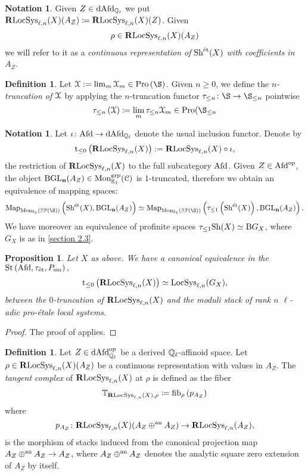 \documentclass[10pt,a4paper]{amsart}
\numberwithin{equation}{subsection}
\theoremstyle{plain}
\newtheorem{prop}[theorem]{Proposition}
\theoremstyle{definition}
\newtheorem{defi}[theorem]{Definition}
\newtheorem{notation}[theorem]{Notation}
\theoremstyle{remark}
\numberwithin{equation}{section}
\begin{document}
\begin{notation}
Given $Z \in \mathrm{dAfd}_{\mathbb{Q}_\ell}$ we put $\mathbf R \mathrm{LocSys}_{\ell, n}(X)(A_Z) \coloneqq \mathbf R \mathrm{LocSys}_{\ell, n}(X)(Z)$. Given 
	\[
		\rho \in \mathbf R \mathrm{LocSys}_{\ell, n}(X)(A_Z)
	\]
we will refer to it as a \emph{continuous representation of }$\mathrm{Sh}^{\text{\'et}}(X)$ \emph{with coefficients in $A_Z$}.
\end{notation}

\begin{defi}
Let $\cX := \lim_m \cX_m \in \pro \left( \S \right)$. Given $n \geq 0$, we define the \emph{$n$-truncation of $\mathcal X$} by applying the $n$-truncation functor $\tau_{\leq n} \colon \S \to \S_{\leq n }$ pointwise
	\[
		\tau_{\leq n} \left(  \cX \right) \coloneqq \lim_m \tau_{\leq n } \cX_m  \in \pro( \S_{\leq n}
	\]
\end{defi}

\begin{notation}
Let $\iota \colon \mathrm{Afd} \to \mathrm{dAfd}_{\mathbb{Q}_\ell}$ denote the usual inclusion functor. Denote by
	\[
		\mathrm t_{\leq 0} \left( \mathbf R \mathrm{LocSys}_{\ell, n}(X) \right) := \mathbf R \mathrm{LocSys}_{\ell, n}(X) \circ \iota,
	\]
the restriction of $\mathbf R \mathrm{LocSys}_{\ell, n}(X)$ to the full subcategory $\mathrm{Afd}$. Given
$Z \in \mathrm{Afd}^{\mathrm{op}}$, the object $\mathbf{ \mathrm B \mathrm{GL}_n}(A_Z) \in \mathrm{Mon}_{\mathbb E_1 }^{\mathrm{grp}}( \mathcal C) $ is $1$-truncated, therefore we obtain an equivalence of mapping spaces:
	\[
		\Map_{\Mon_{\mathbb E_1} \left( \cI \cP (\S)\right) } \left( \Sh^{\et} (X), \mathbf{ \mathrm B \GLn} (A_Z) \right) \simeq \Map_{\Mon_{\mathbb E_1} \left( \cI \cP (\S)\right) } \left( \tau_{\leq 1} \left( \Sh^{\et} (X) \right), \mathbf{ \mathrm B \GLn} (A_Z)\right).
	\]
We have moreover an equivalence of profinite spaces $\tau_{\leq 1} \mathrm{Sh}(X) \simeq \mathrm B G_X$, where $G_X$ is as in \cref{section 2.3}.
\end{notation}

\begin{prop} \label{123}
Let $X$ as above. We have a canonical equivalence in the \infcat $\mathrm{St} \left( \mathrm{Afd}, \tau_{\text{\'et}}, P_{\mathrm{sm}} \right), $
	\[
		\mathrm t_{\leq 0} \left( \mathbf R \mathrm{LocSys}_{\ell, n}(X) \right) \simeq \mathrm{LocSys}_{\ell, n}(G_X),
	\]
between the $0$-truncation of $\mathbf R \mathrm{LocSys}_{\ell, n}(X)$ and the moduli stack of rank $n$ $\ell$-adic pro-\'etale local systems.
\end{prop}

\begin{proof}
The proof of \cite[Theorem 4.5.8]{me1} applies.
\end{proof}

\begin{defi} \label{tangent}
Let $Z \in \mathrm{dAfd}_{\mathbb{Q}_\ell}^{\mathrm{op}}$ be a derived $\mathbb{Q}_\ell$-affinoid space. Let $\rho \in \mathbf R \mathrm{LocSys}_{\ell, n}(X)(A_Z)$ be a continuous representation with values in $A_Z$.
The \emph{tangent complex} of $\mathbf R \mathrm{LocSys}_{\ell, n}(X)$ at $\rho$ is defined as the fiber
	\[
		\mathbb T_{\mathbf R \mathrm{LocSys}_{\ell, n}(X), \rho} \coloneqq \mathrm{fib}_{\rho} \left( p_{A_Z} \right)
	\]
where 
	\[ 
		p_{A_Z} \colon \mathbf R \mathrm{LocSys}_{\ell, n}(X) ( A_Z \oplus^{\mathrm{an}} A_Z) \to \mathbf R \mathrm{LocSys}_{\ell, n}(A_Z), 
	\]
is the morphism of stacks
induced from the canonical projection map $A_Z \oplus^{\mathrm{an}} A_Z \to A_Z$, where $A_Z \oplus^{\mathrm{an}} A_Z$ denotes the analytic square zero extension of $A_Z$ by itself.
\end{defi}
\end{document}
